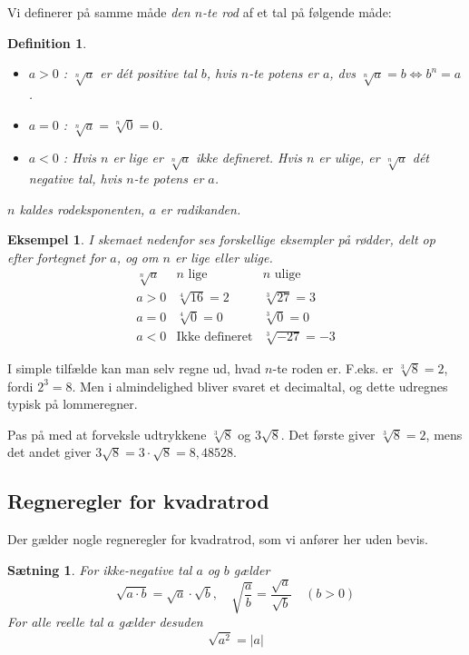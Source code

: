 \documentclass[12pt,oneside,a4paper]{article}
\theoremstyle{plain}
\newtheorem*{thm}{Sætning}
\newtheorem*{mydef}{Definition}
\newtheorem*{eks}{Eksempel}
\begin{document}
Vi definerer på samme måde {\em den $n$-te rod} af et tal på følgende måde:
\begin{mydef}
    \leavevmode
    \begin{itemize}
        \item $a>0$ : $\sqrt[n]{a}$ er dét positive tal $b$, hvis $n$-te potens er
            $a$, dvs $\sqrt[n]{a} = b \Leftrightarrow b^n=a$.
        \item $a=0$ : $\sqrt[n]{a} = \sqrt[n]{0} =0$.
        \item $a<0$ : Hvis $n$ er lige er $\sqrt[n]{a}$ ikke defineret.  Hvis
            $n$ er ulige, er $\sqrt[n]{a}$ dét negative tal, hvis $n$-te potens
            er $a$.
    \end{itemize}

    $n$ kaldes {\em rodeksponenten}, $a$ er {\em radikanden}.
\end{mydef}

\begin{eks}
    I skemaet nedenfor ses forskellige eksempler på rødder, delt op efter
    fortegnet for $a$, og om $n$ er lige eller ulige.
    $$
    \begin{array}{r|c|l}
        \sqrt[n]{a} & \mbox{$n$ lige} & \mbox{$n$ ulige} \\
        \hline
        a > 0 & \sqrt[4]{16} = 2 & \sqrt[3]{27} = 3 \\
        \hline
        a = 0 & \sqrt[4]{0} = 0 & \sqrt[3]{0} = 0 \\
        \hline
        a < 0 & \mbox{Ikke defineret} & \sqrt[3]{-27} = -3
    \end{array}
    $$
\end{eks}

I simple tilfælde kan man selv regne ud, hvad $n$-te roden er. F.eks. er $\sqrt[3]{8}=2$,
fordi $2^3 = 8$. Men i almindelighed bliver svaret et decimaltal, og dette udregnes typisk
på lommeregner.

Pas på med at forveksle udtrykkene $\sqrt[3]{8}$ og $3\sqrt{8}$. Det første
giver $\sqrt[3]{8}=2$, mens det andet giver $3\sqrt{8}=3\cdot \sqrt{8} =
8,48528$.

\subsection*{Regneregler for kvadratrod}
Der gælder nogle regneregler for kvadratrod, som vi anfører her uden bevis.
\begin{thm}
    For ikke-negative tal $a$ og $b$ gælder
    $$
    \sqrt{a\cdot b} = \sqrt{a} \cdot \sqrt{b}, \quad
    \sqrt{\frac{a}{b}} = \frac{\sqrt{a}}{\sqrt{b}} \quad (b>0)
    $$
    For {\em alle} reelle tal $a$ gælder desuden
    $$
    \sqrt{a^2} = |a|
    $$
\end{thm}
\end{document}
